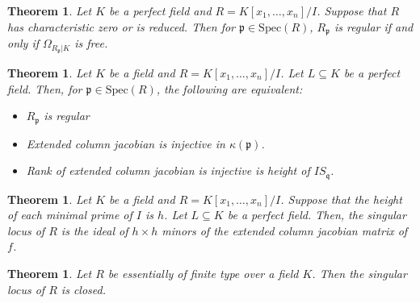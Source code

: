 \documentclass{amsart}[12pt]
\newcommand{\Spec}{\mathrm{Spec}}
\newcommand{\fp}{{\mathfrak p}}
\newcommand{\fq}{{\mathfrak q}}
\numberwithin{equation}{section}
\theoremstyle{plain} %
\newtheorem{thm}[equation]{Theorem}
\theoremstyle{definition}
\theoremstyle{remark}
\begin{document}
\begin{thm} Let $K$ be a perfect field and $R=K[x_1,\dots,x_n]/I$. Suppose that $R$ has characteristic zero or is reduced. Then for $\fp\in \Spec(R)$, $R_{\fp}$ is regular if and only if $\Omega_{R_{\fp}|K}$ is free.
\end{thm}

\begin{thm} Let $K$ be a field and $R=K[x_1,\dots,x_n]/I$. Let $L\subseteq K$ be a perfect field. Then, for $\fp\in \Spec(R)$, the following are equivalent:
\begin{itemize}
\item $R_\fp$ is regular
\item Extended column jacobian is injective in $\kappa(\fp)$.
\item Rank of extended column jacobian is injective is height of $I S_{\fq}$.
\end{itemize}
\end{thm}

\begin{thm} Let $K$ be a field and $R=K[x_1,\dots,x_n]/I$. Suppose that the height of each minimal prime of $I$ is $h$. Let $L\subseteq K$ be a perfect field. Then, the singular locus of $R$ is the ideal of $h\times h$ minors of the extended column jacobian matrix of $f$.
\end{thm}

\begin{thm} Let $R$ be essentially of finite type over a field $K$. Then the singular locus of $R$ is closed.
\end{thm}
\end{document}

